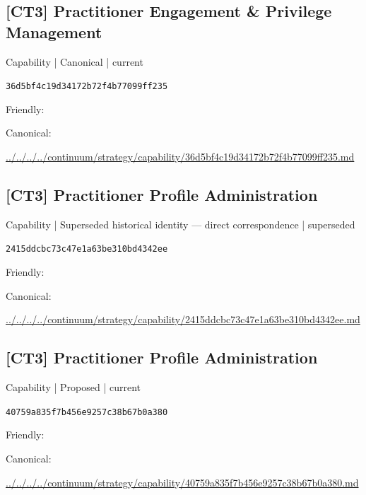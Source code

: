 \documentclass[10pt,a4paper]{article}
\begin{document}
\subsection*{[CT3] Practitioner Engagement \& Privilege Management}
{\small Capability | Canonical | current}\par
\texttt{36d5bf4c19d34172b72f4b77099ff235}\par
Friendly: \par
Canonical: \par
{\footnotesize\url{../../../../continuum/strategy/capability/36d5bf4c19d34172b72f4b77099ff235.md}}\par
\subsection*{[CT3] Practitioner Profile Administration}
{\small Capability | Superseded historical identity — direct correspondence | superseded}\par
\texttt{2415ddcbc73c47e1a63be310bd4342ee}\par
Friendly: \par
Canonical: \par
{\footnotesize\url{../../../../continuum/strategy/capability/2415ddcbc73c47e1a63be310bd4342ee.md}}\par
\subsection*{[CT3] Practitioner Profile Administration}
{\small Capability | Proposed | current}\par
\texttt{40759a835f7b456e9257c38b67b0a380}\par
Friendly: \par
Canonical: \par
{\footnotesize\url{../../../../continuum/strategy/capability/40759a835f7b456e9257c38b67b0a380.md}}\par
\end{document}
